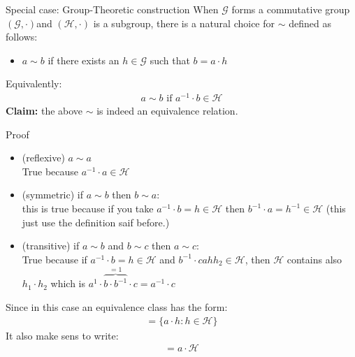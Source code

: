 \begin{parag}{Special case: Group-Theoretic construction}
    When $\mathcal{G}$ forms a commutative group $\left(\mathcal{G}, \cdot \right)$and $\left(\mathcal{H}, \cdot \right)$ is a subgroup, there is a natural choice for $\sim$ defined as follows:
    \begin{itemize}
	    \item $a \sim b$ if there exists an $h \in \mathcal{G}$ such that $b = a \cdot  h$
    \end{itemize}
    Equivalently:
    \begin{align*} a \sim b \text{ if } a^{-1} \cdot  b \in \mathcal{H}\end{align*}
    \textbf{Claim:} the above $\sim$ is indeed an equivalence relation.
    \begin{subparag}{Proof}
        \begin{itemize}
		\item (reflexive) $a \sim a$ \\
			True because $a^{-1} \cdot  a \in \mathcal{H}$
		\item (symmetric) if $a \sim b$ then $b \sim a$: \\
			this is true because if you take $a^{-1} \cdot  b = h \in \mathcal{H}$ then $b^{-1} \cdot  a = h^{-1} \in \mathcal{H}$ (this just use the definition saif before.)
		\item (transitive) if $a \sim b$ and $b \sim c$ then $a \sim c$: \\
			True because if $a^{-1} \cdot  b =  h \in \mathcal{H}$ and $b^{-1} \cdot  c ah h_2 \in \mathcal{H}$, then $\mathcal{H}$ contains also $h_1 \cdot  h_2$ which is $a^{1} \cdot  \overbrace{b \cdot  b^{-1}}^{= 1} \cdot  c =  a^{-1} \cdot  c$
        \end{itemize}
	Since in this case an equivalence class has the form:
	\begin{align*} [a] =  \{a \cdot  h : h \in \mathcal{H}\} \end{align*}
	It also make sens to write:
	\begin{align*} [a] =  a \cdot  \mathcal{H} \end{align*}
    \end{subparag}
    

\end{parag}
